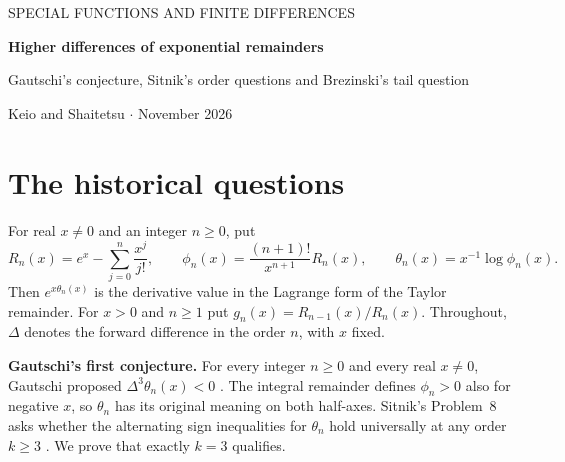 \documentclass[11pt,a4paper]{article}
\begin{document}
\thispagestyle{plain}
\begin{center}
{\small\sffamily\color{accent} SPECIAL FUNCTIONS AND FINITE DIFFERENCES}\par\vspace{8pt}
{\LARGE\bfseries\color{ink}Higher differences of exponential remainders}\par\vspace{5pt}
{\large Gautschi's conjecture, Sitnik's order questions and Brezinski's tail question}\par\vspace{7pt}
{\small Keio and Shaitetsu \quad $\cdot$  November 2026}
\end{center}
\begin{abstract}
We prove Gautschi's 1982 conjecture that the mean-value point $\theta_n(x)$ of the exponential remainder satisfies $\Delta^3\theta_n(x)<0$ for every $n\ge0$ and real $x\ne0$. The proof for positive arguments realizes a logarithmic derivative as the third central moment of a variable clipped at zero. A Gaussian transition shows that every order $k\ge4$ takes both signs for some fixed positive argument, answering Sitnik's Problem~8. For the adjacent remainder ratio $g_n$ in his Problem~11, exactly orders one and two are universally positive. Every order $k\ge3$ takes both signs at each $x\ge8$.
We also refute Brezinski's 1983 suggestion of eventual total monotonicity. At $x=63/2$ and at every sufficiently large $x$, every arithmetic progression of mean-value points fails this property. Strict total monotonicity holds for $0<x\le1/10$. These ranges transfer to additive infinite divisibility of a maximum of exponential random variables.
\end{abstract}

\section{The historical questions}
For real $x\ne0$ and an integer $n\ge0$, put
\[
 R_n(x)=e^x-\sum_{j=0}^n\frac{x^j}{j!},\qquad
 \phi_n(x)=\frac{(n+1)!}{x^{n+1}}R_n(x),\qquad
 \theta_n(x)=x^{-1}\log\phi_n(x).
\]
Then $e^{x\theta_n(x)}$ is the derivative value in the Lagrange form of the Taylor remainder. For $x>0$ and $n\ge1$ put $g_n(x)=R_{n-1}(x)/R_n(x)$. Throughout, $\Delta$ denotes the forward difference in the order $n$, with $x$ fixed.

\textbf{Gautschi's first conjecture.}
For every integer $n\ge0$ and every real $x\ne0$, Gautschi proposed $\Delta^3\theta_n(x)<0$ \cite[pp.~48--49]{gautschi}. The integral remainder defines $\phi_n>0$ also for negative $x$, so $\theta_n$ has its original meaning on both half-axes. Sitnik's Problem~8 asks whether the alternating sign inequalities for $\theta_n$ hold universally at any order $k\ge3$ \cite[pp.~23--24]{sitnik}. We prove that exactly $k=3$ qualifies.
\end{document}
